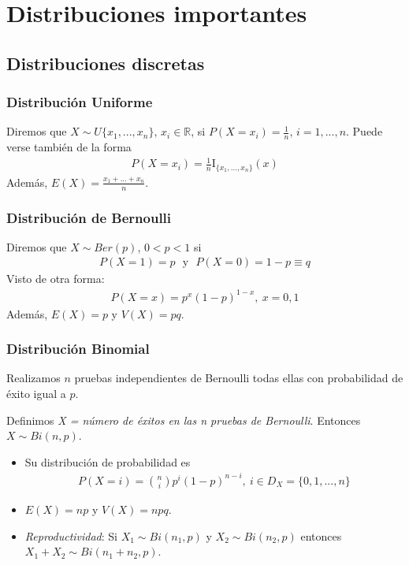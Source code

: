 \setcounter{chapter}{-1}
\chapter{Distribuciones importantes}

\section{Distribuciones discretas}

\subsection{Distribución Uniforme}
Diremos que $X \sim U\{x_1,...,x_n\}$, $x_i \in \mathbb{R}$, si $P(X = x_i) = \frac{1}{n}$, $i = 1,...,n$. Puede verse también de la forma
\begin{align*}
    P(X = x_i) = \frac{1}{n}\text{I}_{\{x_1,...,x_n\}}(x)
\end{align*}
Además, $E(X) = \frac{x_1 + ... + x_n}{n}$.

\subsection{Distribución de Bernoulli}
Diremos que $X \sim Ber(p)$, $0 < p < 1$ si
\begin{align*}
    P(X = 1) = p \ \ \ \text{y} \ \ \ P(X = 0) = 1 - p \equiv q
\end{align*}
Visto de otra forma:
\begin{align*}
    P(X = x) = p^x(1 - p)^{1-x}, \ x = 0,1
\end{align*}
Además, $E(X) = p$ y $V(X) = pq$.

\subsection{Distribución Binomial}
Realizamos $n$ pruebas independientes de Bernoulli todas ellas con probabilidad de éxito igual a $p$.

Definimos \textit{X = número de éxitos en las n pruebas de Bernoulli}. Entonces $X \sim Bi(n,p)$.
\begin{itemize}
    \item Su distribución de probabilidad es
          \begin{align*}
              P(X = i) = \binom{n}{i}p^i(1-p)^{n-i}, \ i \in D_X = \{0,1,...,n\}
          \end{align*}
    \item $E(X) = np$ y $V(X) = npq$.
    \item \textit{Reproductividad}: Si $X_1 \sim Bi(n_1,p)$ y $X_2 \sim Bi(n_2,p)$ entonces $X_1 + X_2 \sim Bi(n_1 + n_2, p)$.
\end{itemize}

